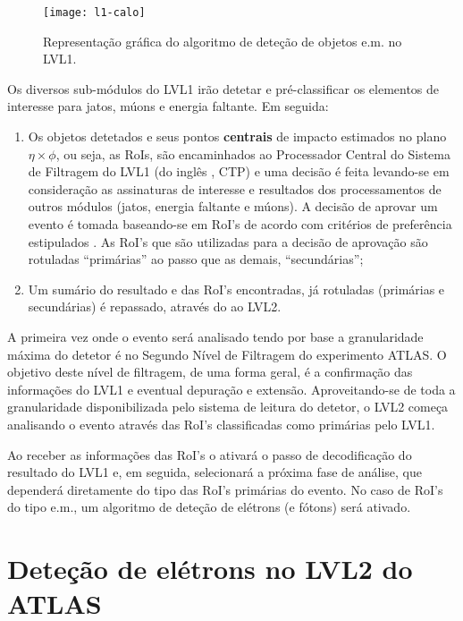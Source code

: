 \begin{figure}
\begin{center}
\texttt{[image: l1-calo]}
\end{center}
\caption{Representação gráfica do algoritmo de deteção de objetos e.m. no LVL1.}
\label{fig:l1-calo}
\end{figure}

Os diversos sub-módulos do LVL1 irão detetar e pré-classificar os elementos de
interesse para jatos, múons e energia faltante. Em seguida:

\begin{enumerate}
\item Os objetos detetados e seus pontos \textbf{centrais} de impacto
estimados no plano $\eta\times\phi$, ou seja, as RoIs, são encaminhados ao
Processador Central do Sistema de Filtragem do LVL1 (do inglês , CTP) e uma decisão é feita levando-se em consideração as
assinaturas de interesse e resultados dos processamentos de outros módulos
(jatos, energia faltante e múons). A decisão de aprovar um evento é tomada
baseando-se em RoI's de acordo com critérios de preferência estipulados . As RoI's que são utilizadas para a decisão de aprovação são rotuladas
``primárias'' ao passo que as demais, ``secundárias'';

\item Um sumário do resultado e das RoI's encontradas, já rotuladas (primárias
e secundárias) é repassado, através do  ao LVL2.
\end{enumerate}

A primeira vez onde o evento será analisado tendo por base a granularidade
máxima do detetor é no Segundo Nível de Filtragem do experimento ATLAS. O
objetivo deste nível de filtragem, de uma forma geral, é a confirmação das
informações do LVL1 e eventual depuração e extensão. Aproveitando-se de toda a
granularidade disponibilizada pelo sistema de leitura do detetor, o LVL2
começa analisando o evento através das RoI's classificadas como primárias pelo
LVL1.

Ao receber as informações das RoI's o  ativará o passo de
decodificação do resultado do LVL1 e, em seguida, selecionará a próxima fase
de análise, que dependerá diretamente do tipo das RoI's primárias do
evento. No caso de RoI's do tipo e.m., um algoritmo de deteção de elétrons (e
fótons) será ativado.

\section{Deteção de elétrons no LVL2 do ATLAS}
\label{sec:classic-detection}

